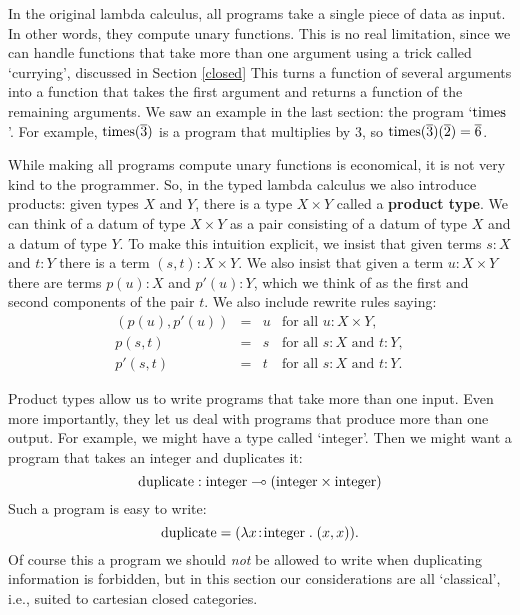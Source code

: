 \documentclass[12pt]{article}
\newcommand{\lhom}{\multimap}
\newcommand{\Times}{{\rm times}}
\newcommand{\integer}{{\rm integer}}
\newcommand{\duplicate}{{\rm duplicate}}
\begin{document}
In the original lambda calculus, all programs take a single piece of
data as input.  In other words, they compute unary functions.  This is
no real limitation, since we can handle functions that take more than
one argument using a trick called `currying', discussed in Section
\ref{closed}  This turns a function of several arguments into a
function that takes the first argument and returns a function of the
remaining arguments.  We saw an example in the last section: the
program `$\Times$'.  For example, $\Times(\overline{3})$ is a program
that multiplies by 3, so $\Times(\overline{3})(\overline{2}) =
\overline{6}$.

While making all programs compute unary functions is economical, it is
not very kind to the programmer.  So, in the typed lambda calculus we
also introduce products: given types $X$ and $Y$, there is a type $X
\times Y$ called a {\bf product type}.  We can think of a datum of
type $X \times Y$ as a pair consisting of a datum of type $X$ and a
datum of type $Y$.  To make this intuition explicit, we insist that
given terms $s:X$ and $t:Y$ there is a term $(s,t):X \times Y$.  We
also insist that given a term $u:X \times Y$ there are terms $p(u):X$
and $p'(u):Y$, which we think of as the first and second components of
the pair $t$.  We also include rewrite rules saying:
\[      
\begin{array}{ccll}
(p(u),p'(u)) &=& u & \textrm{for all } u:X \times Y, \\
p(s,t) &=& s  & \textrm{for all } s\!:\!X \textrm{ and } t\!:\!Y, \\
p'(s,t) &=& t & \textrm{for all } s\!:\!X \textrm{ and } t\!:\!Y .
\end{array}
\]

Product types allow us to write programs that take more than one
input.  Even more importantly, they let us deal with programs that
produce more than one output.  For example, we might have a type
called `integer'.  Then we might want a program that takes an integer
and duplicates it:
\[ 
  \duplicate: \integer \lhom (\integer \times \integer)
\]
Such a program is easy to write:
\[  \duplicate = (\lambda x\!:\!\integer \;.\; (x,x))  .\]
Of course this a program we should {\it not} be allowed to write
when duplicating information is forbidden, but in this section
our considerations are all `classical', i.e., suited to cartesian
closed categories.
\end{document}
